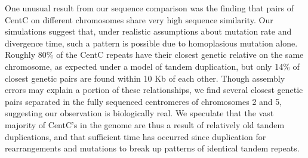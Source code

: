 One unusual result from our sequence comparison was the finding that pairs of CentC on different chromosomes share very high sequence similarity.  
Our simulations suggest that, under realistic assumptions about mutation rate and divergence time, such a pattern is possible due to homoplasious mutation alone.  
Roughly 80\% of the CentC repeats have their closest genetic relative on the same chromosome, as expected under a model of tandem duplication, but only 14\% of closest genetic pairs are found within 10 Kb of each other.
Though assembly errors may explain a portion of these relationships, we find several closest genetic pairs separated in the fully sequenced centromeres of chromosomes 2 and 5, suggesting our observation is biologically real.
We speculate that the vast majority of  CentC’s in the genome are thus a result of relatively old tandem duplications, and that sufficient time has occurred since duplication for rearrangements and mutations to break up patterns of identical tandem repeats.



